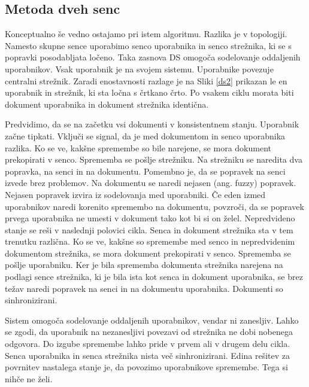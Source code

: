 \documentclass[a4paper, 12pt, twoside]{book}
\begin{document}
\subsection{Metoda dveh senc}

Konceptualno še vedno ostajamo pri istem algoritmu. Razlika je v topologiji. Namesto skupne sence uporabimo senco uporabnika in senco strežnika, ki se s popravki posodabljata ločeno. Taka zasnova DS omogoča sodelovanje oddaljenih uporabnikov. Vsak uporabnik je na svojem sistemu. Uporabnike povezuje centralni strežnik. Zaradi enostavnosti razlage je na Sliki \ref{ds2} prikazan le en uporabnik in strežnik, ki sta ločna s črtkano črto. Po vsakem ciklu morata biti dokument uporabnika in dokument strežnika identična.

Predvidimo, da se na začetku vsi dokumenti v konsistentnem stanju. Uporabnik začne tipkati. Vključi se signal, da je med dokumentom in senco uporabnika razlika. Ko se ve, kakšne spremembe so bile narejene, se mora dokument prekopirati v senco. Sprememba se pošlje strežniku. Na strežniku se naredita dva popravka, na senci in na dokumentu. Pomembno je, da se popravek na senci izvede brez problemov. Na dokumentu se naredi nejasen (ang. fuzzy) popravek. Nejasen popravek izvira iz sodelovanja med uporabniki. Če eden izmed uporabnikov naredi korenito spremembo na dokumentu, povzroči, da se popravek prvega uporabnika ne umesti v dokument tako kot bi si on želel. Nepredvideno stanje se reši v naslednji polovici cikla. Senca in dokument strežnika sta v tem trenutku različna. Ko se ve, kakšne so spremembe med senco in nepredvidenim dokumentom strežnika, se mora dokument prekopirati v senco. Sprememba se pošlje uporabniku. Ker je bila sprememba dokumenta strežnika narejena na podlagi sence strežnika, ki je bila ista kot senca in dokument uporabnika, se brez težav naredi popravek na senci in na dokumentu uporabnika. Dokumenti so sinhronizirani.

Sistem omogoča sodelovanje oddaljenih uporabnikov, vendar ni zanesljiv. Lahko se zgodi, da uporabnik na nezanesljivi povezavi od strežnika ne dobi nobenega odgovora. Do izgube spremembe lahko pride v prvem ali v drugem delu cikla. Senca uporabnika in senca strežnika nista več sinhronizirani. Edina rešitev za povrnitev nastalega stanje je, da povozimo uporabnikove spremembe. Tega si nihče ne želi.
\end{document}
